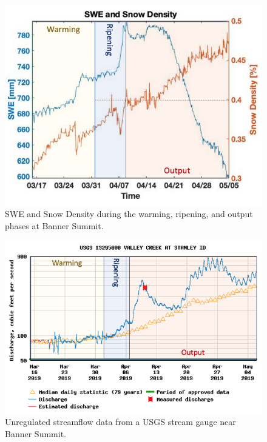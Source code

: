   \begin{figure}
    \centering
    \includegraphics[width=0.8\linewidth]{figures/RunoffTiming/SWE_Density.png}
    \caption{SWE and Snow Density during the warming, ripening, and output phases at Banner Summit.}
    \label{fig:ValleyCreek}
 \end{figure}

\begin{figure}
    \centering
    \includegraphics[width=1\linewidth]{figures/RunoffTiming/HydrographPhases.png}
    \caption{Unregulated streamflow data from a USGS stream gauge near Banner Summit.}
    \label{fig:HydrographPhases}
 \end{figure}


